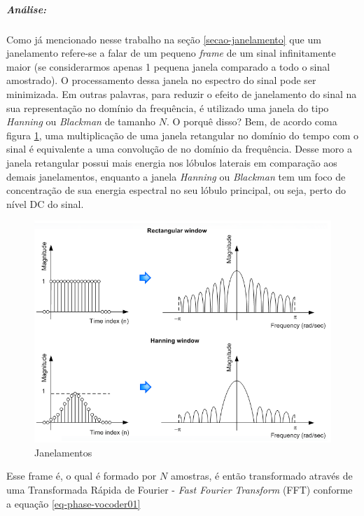 				\subparagraph{Análise:}
				
					Como já mencionado nesse trabalho na seção \ref{secao-janelamento} que um janelamento refere-se a falar de um pequeno \textit{frame} de um sinal infinitamente maior (se considerarmos apenas 1 pequena janela comparado a todo o sinal amostrado). O processamento dessa janela no espectro do sinal pode ser minimizada. Em outras palavras, para reduzir o efeito de janelamento do sinal na sua representação no domínio da frequência, é utilizado uma janela do tipo \textit{Hanning} ou \textit{Blackman} de tamanho $ N $. O porquê disso? Bem, de acordo coma  figura \ref{fig-phase-vocoder01}, uma multiplicação de uma janela retangular no domínio do tempo com o sinal é equivalente a uma convolução de no domínio da frequência. Desse moro a janela retangular possui mais energia nos lóbulos laterais em comparação aos demais janelamentos, enquanto a janela \textit{Hanning} ou \textit{Blackman} tem um foco de concentração de sua energia espectral no seu lóbulo principal, ou seja, perto do nível DC do sinal.
					
					\begin{figure}[!ht]
						\centering
						\includegraphics[scale=0.5]{./figuras/phase-vocoder-02.PNG}
						\caption{Janelamentos}
						\label{fig-phase-vocoder01}
					\end{figure}
					
					Esse frame é, o qual é formado por $ N $ amostras, é então transformado através de uma Transformada Rápida de Fourier - \textit{Fast Fourier Transform} (FFT) conforme a equação \ref{eq-phase-vocoder01}
					
